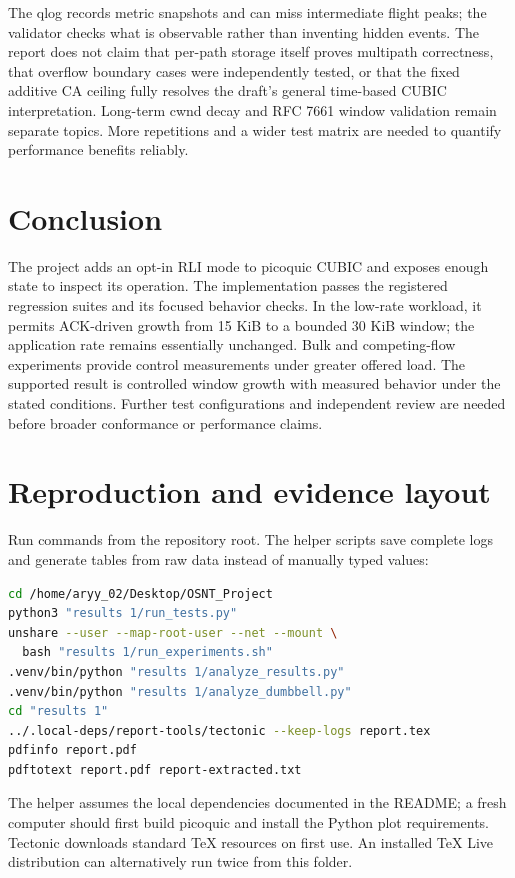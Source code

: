 \documentclass[11pt,a4paper]{article}
\newcommand{\code}[1]{\texttt{\detokenize{#1}}}
\begin{document}
The qlog records metric snapshots and can miss intermediate flight peaks;
the validator checks what is observable rather than inventing hidden
events. The report does not claim that per-path storage itself proves
multipath correctness, that overflow boundary cases were independently
tested, or that the fixed additive CA ceiling fully resolves the draft's
general time-based CUBIC interpretation. Long-term cwnd decay and RFC 7661
window validation remain separate topics. More repetitions and a wider
test matrix are needed to quantify performance benefits reliably.

\section{Conclusion}
The project adds an opt-in RLI mode to picoquic CUBIC and exposes enough
state to inspect its operation. The implementation passes the registered
regression suites and its focused behavior checks. In the low-rate workload,
it permits ACK-driven growth from 15 KiB to a bounded 30 KiB window;
the application rate remains essentially unchanged. Bulk and competing-flow
experiments provide control measurements under greater offered load.
The supported result is controlled window growth with measured behavior
under the stated conditions. Further test configurations and independent
review are needed before broader conformance or performance claims.

\section{Reproduction and evidence layout}
Run commands from the repository root. The helper scripts save complete
logs and generate tables from raw data instead of manually typed values:
\begin{lstlisting}[language=bash]
cd /home/aryy_02/Desktop/OSNT_Project
python3 "results 1/run_tests.py"
unshare --user --map-root-user --net --mount \
  bash "results 1/run_experiments.sh"
.venv/bin/python "results 1/analyze_results.py"
.venv/bin/python "results 1/analyze_dumbbell.py"
cd "results 1"
../.local-deps/report-tools/tectonic --keep-logs report.tex
pdfinfo report.pdf
pdftotext report.pdf report-extracted.txt
\end{lstlisting}
The helper assumes the local dependencies documented in the README; a
fresh computer should first build picoquic and install the Python plot
requirements. Tectonic downloads standard TeX resources on first use.
An installed TeX Live distribution can alternatively run
\code{pdflatex report.tex} twice from this folder.
\end{document}
